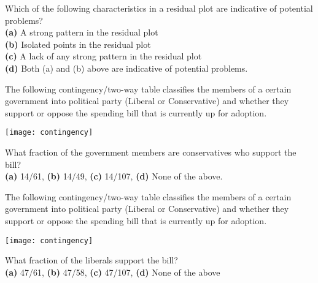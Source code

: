 \documentclass[Lecture.tex]{subfiles}
\begin{document}
\begin{frame}
Which of the following characteristics in a residual plot are indicative of potential problems?\\
{\bf (a)} A strong pattern in the residual plot\\
{\bf (b)} Isolated points in the residual plot\\
{\bf (c)} A lack of any strong pattern in the residual plot\\
{\bf (d)} Both (a) and (b) above are indicative of potential problems.
\end{frame}

\begin{frame}
The following contingency/two-way table classifies the members of a certain government into political party (Liberal or Conservative) and whether they support or oppose the spending bill that is currently up for adoption.
\begin{center}
\texttt{[image: contingency]}
\end{center}
What fraction of the government members are conservatives who support the bill?\\
{\bf (a)} 14/61, {\bf (b)} 14/49, {\bf (c)} 14/107, {\bf (d)} None of the above.
\end{frame}

\begin{frame}
The following contingency/two-way table classifies the members of a certain government into political party (Liberal or Conservative) and whether they support or oppose the spending bill that is currently up for adoption.
\begin{center}
\texttt{[image: contingency]}
\end{center}
What fraction of the liberals support the bill?\\
{\bf (a)} 47/61, {\bf (b)} 47/58, {\bf (c)} 47/107, {\bf (d)} None of the above
\end{frame}
\end{document}
